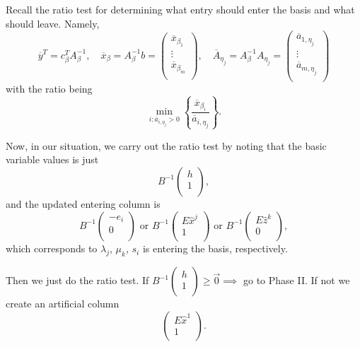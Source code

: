 Recall the ratio test for determining what entry should enter the basis and what should leave. Namely,
\[
	\overline{y}^{T} = c_{\beta}^{T} A_{\beta}^{-1},\quad \overline{x}_{\beta} = A_{\beta}^{-1} b = \begin{pmatrix}
		\overline{x}_{\beta_1} \\
		\vdots                 \\
		\overline{x}_{\beta_m} \\
	\end{pmatrix}, \quad \overline{A}_{\eta_{j}} = A_{\beta}^{-1} A_{\eta_{j}} = \begin{pmatrix}
		\overline{a}_{1, \eta_{j}} \\
		\vdots                     \\
		\overline{a}_{m, \eta_{j}} \\
	\end{pmatrix}
\]
with the ratio being
\[
	\min_{i\colon \overline{a}_{i, \eta_{j}}>0}\left\{\frac{\overline{x}_{\beta_{i}}}{\overline{a}_{i, \eta_{j}}}\right\}.
\]

Now, in our situation, we carry out the ratio test by noting that the basic variable values is just
\[
	B^{-1}\begin{pmatrix}
		h \\
		1 \\
	\end{pmatrix},
\]
and the updated entering column is
\[
	B^{-1} 	\begin{pmatrix}
		-e_{i} \\
		0      \\
	\end{pmatrix} \text{ or } B^{-1}\begin{pmatrix}
		E \hat{x}^j \\
		1           \\
	\end{pmatrix} \text{ or } B^{-1}\begin{pmatrix}
		E \hat{z}^k \\
		0           \\
	\end{pmatrix},
\]
which corresponds to \(\lambda_{j}\), \(\mu_k\), \(s_{i}\) is entering the basis, respectively.

Then we just do the ratio test. If \(B^{-1}\begin{pmatrix}
	h \\
	1 \\
\end{pmatrix}\geq \vec{0}\implies\) go to Phase II. If not we create an artificial column
\[
	\begin{pmatrix}
		E\hat{x}^1 \\
		1          \\
	\end{pmatrix}.
\]